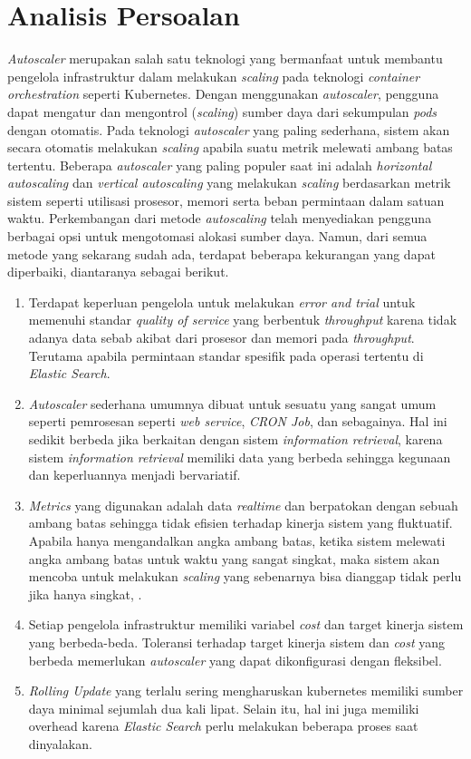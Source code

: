 \section{Analisis Persoalan}

\textit{Autoscaler} merupakan salah satu teknologi yang bermanfaat untuk membantu pengelola infrastruktur dalam melakukan \textit{scaling} pada teknologi \textit{container orchestration} seperti Kubernetes. Dengan menggunakan \textit{autoscaler}, pengguna dapat mengatur dan mengontrol (\textit{scaling}) sumber daya dari sekumpulan \textit{pods} dengan otomatis. Pada teknologi \textit{autoscaler} yang paling sederhana, sistem akan secara otomatis melakukan \textit{scaling} apabila suatu metrik melewati ambang batas tertentu. Beberapa \textit{autoscaler} yang paling populer saat ini adalah \textit{horizontal autoscaling} dan \textit{vertical autoscaling} yang melakukan \textit{scaling} berdasarkan metrik sistem seperti utilisasi prosesor, memori serta beban permintaan dalam satuan waktu. Perkembangan dari metode \textit{autoscaling} telah menyediakan pengguna berbagai opsi untuk mengotomasi alokasi sumber daya. Namun, dari semua metode yang sekarang sudah ada, terdapat beberapa kekurangan yang dapat diperbaiki, diantaranya sebagai berikut.

\begin{enumerate}
    \item Terdapat keperluan pengelola untuk melakukan \textit{error and trial} untuk memenuhi standar \textit{quality of service} yang berbentuk \textit{throughput} karena tidak adanya data sebab akibat dari prosesor dan memori pada \textit{throughput}. Terutama apabila permintaan standar spesifik pada operasi tertentu di \textit{Elastic Search}.
    \item \textit{Autoscaler} sederhana umumnya dibuat untuk sesuatu yang sangat umum seperti pemrosesan seperti \textit{web service}, \textit{CRON Job}, dan sebagainya. Hal ini sedikit berbeda jika berkaitan dengan sistem \textit{information retrieval}, karena sistem \textit{information retrieval} memiliki data yang berbeda sehingga kegunaan dan keperluannya menjadi bervariatif.
    \item \textit{Metrics} yang digunakan adalah data \textit{realtime} dan berpatokan dengan sebuah ambang batas sehingga tidak efisien terhadap kinerja sistem yang fluktuatif. Apabila hanya mengandalkan angka ambang batas, ketika sistem melewati angka ambang batas untuk waktu yang sangat singkat, maka sistem akan mencoba untuk melakukan \textit{scaling} yang sebenarnya bisa dianggap tidak perlu jika hanya singkat, \parencite{riset1}.
    \item Setiap pengelola infrastruktur memiliki variabel \textit{cost} dan target kinerja sistem yang berbeda-beda. Toleransi terhadap target kinerja sistem dan \textit{cost} yang berbeda memerlukan \textit{autoscaler} yang dapat dikonfigurasi dengan fleksibel.
    \item \textit{Rolling Update} yang terlalu sering mengharuskan kubernetes memiliki sumber daya minimal sejumlah dua kali lipat. Selain itu, hal ini juga memiliki overhead karena \textit{Elastic Search} perlu melakukan beberapa proses saat dinyalakan.
\end{enumerate}

